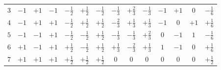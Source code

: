 \begin{frame}[b]
\begin{table}
\begin{tabular}{c c c c c c c c c c c c c c}
            $3$            & $-1$           & $+1$           & $-1$           & $-\frac{1}{2}$                          & $+\frac{1}{2}$                          & $-\frac{1}{2}$                          & $-\frac{1}{3}$                         & $+\frac{2}{3}$                         & $-\frac{1}{3}$                         & $-1$                                            & $+1$                                            & $0$                                             & $-\frac{1}{6}$                         \\

            $4$            & $-1$           & $+1$           & $+1$           & $-\frac{1}{2}$                          & $+\frac{1}{2}$                          & $+\frac{1}{2}$                          & $-\frac{2}{3}$                         & $+\frac{1}{3}$                         & $+\frac{1}{3}$                         & $-1$                                            & $0$                                             & $+1$                                            & $+\frac{1}{6}$                         \\

            $5$            & $-1$           & $-1$           & $+1$           & $-\frac{1}{2}$                          & $-\frac{1}{2}$                          & $+\frac{1}{2}$                          & $-\frac{1}{3}$                         & $-\frac{1}{3}$                         & $+\frac{2}{3}$                         & $0$                                             & $-1$                                            & $1$                                             & $-\frac{1}{6}$                         \\

            $6$            & $+1$           & $-1$           & $+1$           & $+\frac{1}{2}$                          & $-\frac{1}{2}$                          & $+\frac{1}{2}$                          & $+\frac{1}{3}$                         & $-\frac{2}{3}$                         & $+\frac{1}{3}$                         & $1$                                             & $-1$                                            & $0$                                             & $+\frac{1}{6}$                         \\

            $7$            & $+1$           & $+1$           & $+1$           & $+\frac{1}{2}$                          & $+\frac{1}{2}$                          & $+\frac{1}{2}$                          & $0$                                    & $0$                                    & $0$                                    & $0$                                             & $0$                                             & $0$                                             & $+\frac{1}{2}$                         \\


\end{tabular}
\end{table}
\end{frame}
